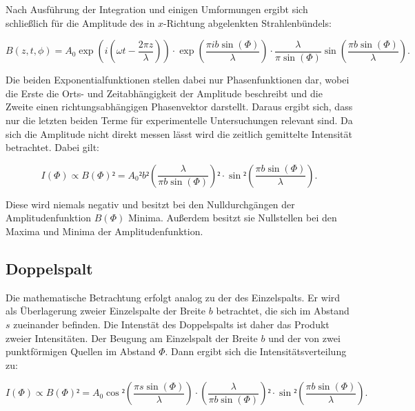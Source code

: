 Nach Ausführung der Integration und einigen Umformungen ergibt sich schließlich für die Amplitude 
des in $x$-Richtung abgelenkten Strahlenbündels: 

\begin{equation*}
B(z,t,\phi) = A_0 \exp{\left(i\left(\omega t - \frac{2\pi z}{\lambda}\right)\right)}\cdot \exp{\left(\frac{\pi i b \sin{(\Phi)}}{\lambda}\right)}\cdot
\frac{\lambda}{\pi \sin{(\Phi)}}\sin{\left(\frac{\pi b \sin{(\Phi)}}{\lambda}\right)}.
\end{equation*}

Die beiden Exponentialfunktionen stellen dabei nur Phasenfunktionen dar, wobei die Erste die Orts- und Zeitabhängigkeit 
der Amplitude beschreibt und die Zweite einen richtungsabhängigen Phasenvektor darstellt. Daraus ergibt sich, dass nur 
die letzten beiden Terme für experimentelle Untersuchungen relevant sind. Da sich die Amplitude nicht direkt 
messen lässt wird die zeitlich gemittelte Intensität betrachtet. Dabei gilt: 

\begin{equation}
I(\Phi) \propto B(\Phi)² = A_0² b² \left(\frac{\lambda}{\pi b \sin{(\Phi)}}\right)²\cdot \sin²{\left(\frac{\pi b \sin{(\Phi)}}{\lambda}\right)}.
\label{eqn:einfach}
\end{equation}

Diese wird niemals negativ und besitzt bei den Nulldurchgängen der Amplitudenfunktion $B(\Phi)$ Minima. Außerdem besitzt 
sie Nullstellen bei den Maxima und Minima der Amplitudenfunktion.

\subsection{Doppelspalt}

Die mathematische Betrachtung erfolgt analog zu der des Einzelspalts. Er wird als Überlagerung zweier Einzelspalte
der Breite $b$ betrachtet, die sich im Abstand $s$ zueinander befinden. Die Intenstät des Doppelspalts ist daher 
das Produkt zweier Intensitäten. Der Beugung am Einzelspalt der Breite $b$ und der von zwei punktförmigen 
Quellen im Abstand $\Phi$. Dann ergibt sich die Intensitätsverteilung zu: 

\begin{equation}
I(\Phi) \propto B(\Phi)² = A_0 \cos²{\left(\frac{\pi s \sin{(\Phi)}}{\lambda}\right)}\cdot \left(\frac{\lambda}{\pi b \sin{(\Phi)}}\right)² 
\cdot \sin²{\left(\frac{\pi b \sin{(\Phi)}}{\lambda}\right)}. 
\label{eqn:doppel}
\end{equation}

